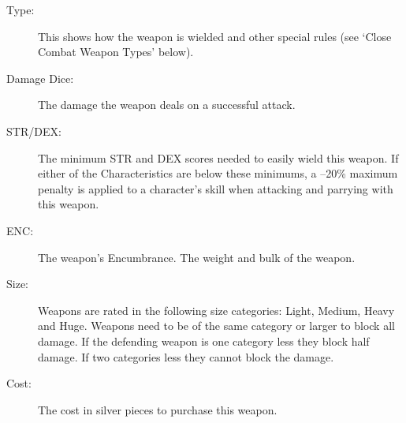 \begin{description}
	\item[Type:] This shows how the weapon is wielded and other special rules (see `Close Combat Weapon Types' below).
	\item[Damage Dice:] The damage the weapon deals on a successful attack. 
	\item[STR/DEX:] The minimum STR and DEX scores needed to easily wield this weapon. If either of the Characteristics are below these minimums, a –20\% maximum penalty is applied to a character’s skill when attacking and parrying with this weapon. 
	\item[ENC:] The weapon’s Encumbrance. The weight and bulk of the weapon. 
	\item[Size:] Weapons are rated in the following size categories: Light, Medium, Heavy and Huge. Weapons need to be of the same category or larger to block all damage. If the defending weapon is one category less they block half damage. If two categories less they cannot block the damage.
	\item[Cost:] The cost in silver pieces to purchase this weapon. 
\end{description}

